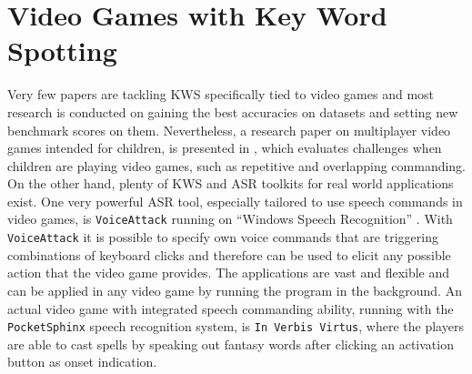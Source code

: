 
\section{Video Games with Key Word Spotting}\label{sec:prev_kws_games}
Very few papers are tackling KWS specifically tied to video games and most research is conducted on gaining the best accuracies on datasets and setting new benchmark scores on them.
Nevertheless, a research paper on multiplayer video games intended for children, is presented in \cite{Harshavardhan2015}, which evaluates challenges when children are playing video games, such as repetitive and overlapping commanding.
On the other hand, plenty of KWS and ASR toolkits for real world applications exist.
One very powerful ASR tool, especially tailored to use speech commands in video games, is \texttt{VoiceAttack} running on \enquote{Windows Speech Recognition} \cite{Xiong2017}.
With \texttt{VoiceAttack} it is possible to specify own voice commands that are triggering combinations of keyboard clicks and therefore can be used to elicit any possible action that the video game provides.
The applications are vast and flexible and can be applied in any video game by running the program in the background.
An actual video game with integrated speech commanding ability, running with the \texttt{PocketSphinx} \cite{Huggins2006} speech recognition system, is \texttt{In Verbis Virtus}, where the players are able to cast spells by speaking out fantasy words after clicking an activation button as onset indication.